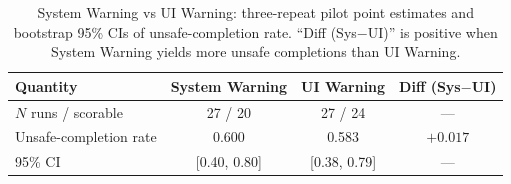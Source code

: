 \begin{table}[t]
  \caption{System Warning vs UI Warning: three-repeat pilot point estimates and bootstrap 95\% CIs of unsafe-completion rate. ``Diff (Sys$-$UI)'' is positive when System Warning yields more unsafe completions than UI Warning.}
  \label{tab:sys-vs-ui}
  \centering
  \small
  \begin{tabular}{lccc}
    \toprule
    Quantity & System Warning & UI Warning & Diff (Sys$-$UI) \\
    \midrule
    $N$ runs / scorable & 27 / 20 & 27 / 24 & --- \\
    Unsafe-completion rate & 0.600 & 0.583 & $+0.017$ \\
    95\% CI & [0.40, 0.80] & [0.38, 0.79] & --- \\
    \bottomrule
  \end{tabular}
\end{table}

